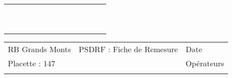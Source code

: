 \documentclass[a4paper, landscape]{article}\usepackage[]{graphicx}\usepackage[]{color}
\begin{document}
{\begin{tabular}{|p{1cm}|p{2cm}|p{1.6cm}|p{1.6cm}|p{1.6cm}|p{1.6cm}|p{1.5cm}|p{1.5cm}|p{1.5cm}|p{1.5cm}|p{1.5cm}|p{7.5cm}|p{5cm}|}
   \rowcolor[gray]{0.95} \hline
 &  &  &  &  &  &  &  &  &  &  &  &  \\ 
   \hline
 &  &  &  &  &  &  &  &  &  &  &  &  \\ 
   \rowcolor[gray]{0.95} \hline
 &  &  &  &  &  &  &  &  &  &  &  &  \\ 
   \hline
 &  &  &  &  &  &  &  &  &  &  &  &  \\ 
   \rowcolor[gray]{0.95} \hline
 &  &  &  &  &  &  &  &  &  &  &  &  \\ 
   \hline
 &  &  &  &  &  &  &  &  &  &  &  &  \\ 
   \rowcolor[gray]{0.95} \hline
 &  &  &  &  &  &  &  &  &  &  &  &  \\ 
   \hline
 &  &  &  &  &  &  &  &  &  &  &  &  \\ 
   \rowcolor[gray]{0.95} \hline
 &  &  &  &  &  &  &  &  &  &  &  &  \\ 
   \hline
 &  &  &  &  &  &  &  &  &  &  &  &  \\ 
   \rowcolor[gray]{0.95} \hline
 &  &  &  &  &  &  &  &  &  &  &  &  \\ 
   \hline
\end{tabular}
}

\begin{tabular}{p{10cm}p{10cm}p{8cm}}
  RB Grands Monts & PSDRF : Fiche de Remesure & Date \\ 
  Placette : 147 &  & Opérateurs \\ 
   &  &  \\ 
  \end{tabular}
\end{document}
